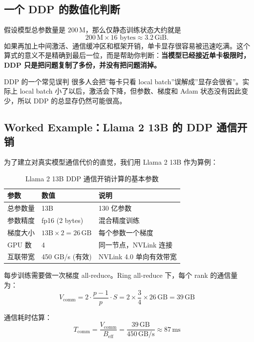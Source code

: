 \documentclass[a4paper]{article}
\begin{document}
\subsection{一个 DDP 的数值化判断}

假设模型总参数量是 $200\,\text{M}$，那么仅静态训练状态大约就是
\[
200\,\text{M} \times 16 \text{ bytes} \approx 3.2\,\text{GiB}.
\]
如果再加上中间激活、通信缓冲区和框架开销，单卡显存很容易被迅速吃满。这个算式的意义不是精确到最后一位，而是帮助你判断：\textbf{当模型已经接近单卡极限时，DDP 只是把问题复制了多份，并没有把问题消掉。}

\begin{warningbox}{DDP 的一个常见误判}
很多人会把”每卡只看 local batch”误解成”显存会很省”。实际上 local batch 小了以后，激活会下降，但参数、梯度和 Adam 状态没有因此变少，所以 DDP 的总显存仍然可能很高。
\end{warningbox}

\subsection{Worked Example：Llama 2 13B 的 DDP 通信开销}

为了建立对真实模型通信代价的直觉，我们用 Llama 2 13B 作为算例：

\begin{table}[H]
\centering
\small
\begin{tabular}{p{4cm}p{3cm}p{5cm}}
\toprule
\textbf{参数} & \textbf{数值} & \textbf{说明} \\
\midrule
总参数量 & 13B & 130 亿参数 \\
参数精度 & fp16 (2 bytes) & 混合精度训练 \\
梯度大小 & $13\text{B} \times 2 = 26\,\text{GB}$ & 每个参数一个梯度 \\
GPU 数 & 4 & 同一节点，NVLink 连接 \\
互联带宽 & 450 GB/s (有效) & NVLink 4.0 单向有效带宽 \\
\bottomrule
\end{tabular}
\caption{Llama 2 13B DDP 通信开销计算的基本参数}
\end{table}

每步训练需要做一次梯度 all-reduce。Ring all-reduce 下，每个 rank 的通信量为：
\[
V_{\text{comm}} = 2 \cdot \frac{p-1}{p} \cdot S = 2 \times \frac{3}{4} \times 26\,\text{GB} = 39\,\text{GB}
\]

通信耗时估算：
\[
T_{\text{comm}} = \frac{V_{\text{comm}}}{B_{\text{eff}}} = \frac{39\,\text{GB}}{450\,\text{GB/s}} \approx 87\,\text{ms}
\]
\end{document}
